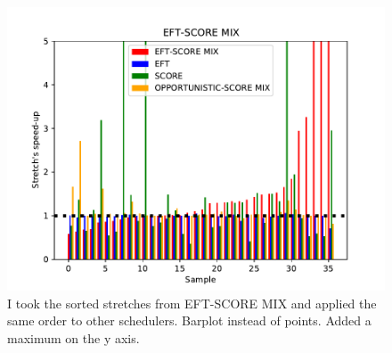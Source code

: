 \documentclass[conference,10pt]{IEEEtran}
\begin{document}
\begin{figure}\centering\includegraphics[width=1\linewidth]{../MBSS/plot/Scatter/scatter_mean_stretch_all_workloads_EFT-SCORE-MIX_v2.pdf}\caption{I took the sorted stretches from EFT-SCORE MIX and applied the same order to other schedulers. Barplot instead of points. Added a maximum on the y axis.}\end{figure}
\end{document}
